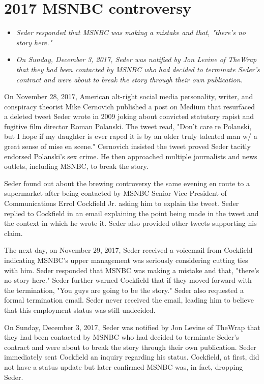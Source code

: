 \section{2017 MSNBC controversy}\label{msnbc-controversy}

\begin{itemize}
\item
  \emph{Seder responded that MSNBC was making a mistake and that,
  "there's no story here."}
\item
  \emph{On Sunday, December 3, 2017, Seder was notified by Jon Levine of
  TheWrap that they had been contacted by MSNBC who had decided to
  terminate Seder's contract and were about to break the story through
  their own publication.}
\end{itemize}

On November 28, 2017, American alt-right social media personality,
writer, and conspiracy theorist Mike Cernovich published a post on
Medium that resurfaced a deleted tweet Seder wrote in 2009 joking about
convicted statutory rapist and fugitive film director Roman Polanski.
The tweet read, "Don't care re Polanski, but I hope if my daughter is
ever raped it is by an older truly talented man w/ a great sense of mise
en scene." Cernovich insisted the tweet proved Seder tacitly endorsed
Polanski's sex crime. He then approached multiple journalists and news
outlets, including MSNBC, to break the story.

Seder found out about the brewing controversy the same evening en route
to a supermarket after being contacted by MSNBC Senior Vice President of
Communications Errol Cockfield Jr. asking him to explain the tweet.
Seder replied to Cockfield in an email explaining the point being made
in the tweet and the context in which he wrote it. Seder also provided
other tweets supporting his claim.

The next day, on November 29, 2017, Seder received a voicemail from
Cockfield indicating MSNBC's upper management was seriously considering
cutting ties with him. Seder responded that MSNBC was making a mistake
and that, "there's no story here." Seder further warned Cockfield that
if they moved forward with the termination, "You guys are going to be
the story." Seder also requested a formal termination email. Seder never
received the email, leading him to believe that this employment status
was still undecided.

On Sunday, December 3, 2017, Seder was notified by Jon Levine of TheWrap
that they had been contacted by MSNBC who had decided to terminate
Seder's contract and were about to break the story through their own
publication. Seder immediately sent Cockfield an inquiry regarding his
status. Cockfield, at first, did not have a status update but later
confirmed MSNBC was, in fact, dropping Seder.

